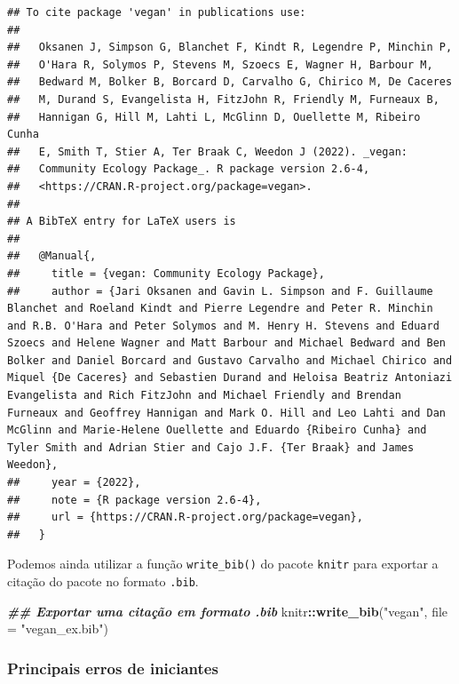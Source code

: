 \documentclass[
]{article}
\newenvironment{Shaded}{\begin{snugshade}}{\end{snugshade}}
\newcommand{\AttributeTok}[1]{\textcolor[rgb]{0.13,0.29,0.53}{#1}}
\newcommand{\DocumentationTok}[1]{\textcolor[rgb]{0.56,0.35,0.01}{\textbf{\textit{#1}}}}
\newcommand{\FunctionTok}[1]{\textcolor[rgb]{0.13,0.29,0.53}{\textbf{#1}}}
\newcommand{\NormalTok}[1]{#1}
\newcommand{\SpecialCharTok}[1]{\textcolor[rgb]{0.81,0.36,0.00}{\textbf{#1}}}
\newcommand{\StringTok}[1]{\textcolor[rgb]{0.31,0.60,0.02}{#1}}
\begin{document}
\begin{verbatim}
## To cite package 'vegan' in publications use:
## 
##   Oksanen J, Simpson G, Blanchet F, Kindt R, Legendre P, Minchin P,
##   O'Hara R, Solymos P, Stevens M, Szoecs E, Wagner H, Barbour M,
##   Bedward M, Bolker B, Borcard D, Carvalho G, Chirico M, De Caceres
##   M, Durand S, Evangelista H, FitzJohn R, Friendly M, Furneaux B,
##   Hannigan G, Hill M, Lahti L, McGlinn D, Ouellette M, Ribeiro Cunha
##   E, Smith T, Stier A, Ter Braak C, Weedon J (2022). _vegan:
##   Community Ecology Package_. R package version 2.6-4,
##   <https://CRAN.R-project.org/package=vegan>.
## 
## A BibTeX entry for LaTeX users is
## 
##   @Manual{,
##     title = {vegan: Community Ecology Package},
##     author = {Jari Oksanen and Gavin L. Simpson and F. Guillaume Blanchet and Roeland Kindt and Pierre Legendre and Peter R. Minchin and R.B. O'Hara and Peter Solymos and M. Henry H. Stevens and Eduard Szoecs and Helene Wagner and Matt Barbour and Michael Bedward and Ben Bolker and Daniel Borcard and Gustavo Carvalho and Michael Chirico and Miquel {De Caceres} and Sebastien Durand and Heloisa Beatriz Antoniazi Evangelista and Rich FitzJohn and Michael Friendly and Brendan Furneaux and Geoffrey Hannigan and Mark O. Hill and Leo Lahti and Dan McGlinn and Marie-Helene Ouellette and Eduardo {Ribeiro Cunha} and Tyler Smith and Adrian Stier and Cajo J.F. {Ter Braak} and James Weedon},
##     year = {2022},
##     note = {R package version 2.6-4},
##     url = {https://CRAN.R-project.org/package=vegan},
##   }
\end{verbatim}

Podemos ainda utilizar a função \texttt{write\_bib()} do pacote \texttt{knitr} para exportar a citação do pacote no formato \texttt{.bib}.

\begin{Shaded}
\begin{Highlighting}[]
\DocumentationTok{\#\# Exportar uma citação em formato .bib}
\NormalTok{knitr}\SpecialCharTok{::}\FunctionTok{write\_bib}\NormalTok{(}\StringTok{"vegan"}\NormalTok{, }\AttributeTok{file =} \StringTok{"vegan\_ex.bib"}\NormalTok{)}
\end{Highlighting}
\end{Shaded}

\hypertarget{principais-erros-de-iniciantes}{%
\subsubsection{Principais erros de iniciantes}\label{principais-erros-de-iniciantes}}
\end{document}
